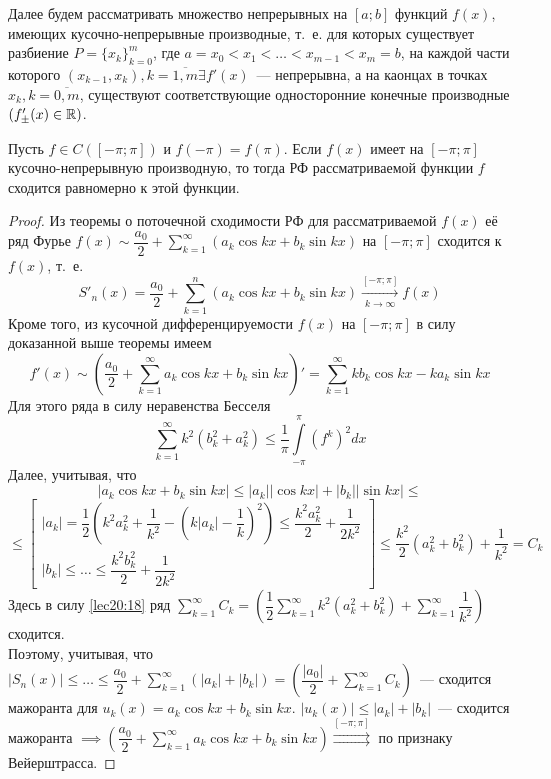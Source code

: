 \documentclass[../../main.tex]{subfiles}
\begin{document}
	Далее будем рассматривать множество непрерывных на $ [a; b] $
	функций $ f(x) $, имеющих кусочно-непрерывные производные, т.~е.
	для которых существует разбиение $ P = \{x_k\}_{k = 0}^m $, 
	где $ a = x_0 < x_1 < \dots < x_{m - 1} < x_m = b $, 
	на каждой части которого $ (x_{k - 1}, x_k), k = \overline{1, m} 
	\exists f'(x) $~--- непрерывна, а на каонцах в точках $ x_k,
	k = \overline{0, m} $, существуют соответствующие односторонние
	конечные производные$(f'_\pm(x) \in \mathbb{R})$.\\
	\begin{thm}
		Пусть $ f \in C([-\pi; \pi]) $ и $ f(-\pi) = f(\pi) $. 
		Если $ f(x) $ имеет на $ [-\pi; \pi] $ кусочно-непрерывную 
		производную, то тогда РФ рассматриваемой функции $f$
		сходится равномерно к этой функции.
	\end{thm}
	\begin{proof}
		Из теоремы о поточечной сходимости РФ для рассматриваемой 
		$ f(x) $ её ряд Фурье 
		$ f(x) \sim \dfrac{a_0}{2} + \sum\limits_{k = 1}^{\infty}
		(a_k\cos{kx} + b_k\sin{kx}) $ 
		на $ [-\pi; \pi] $ сходится к $ f(x) $, т.~е.
		\[
		S'_n(x) = \dfrac{a_0}{2} + \sum\limits_{k = 1}^n(
		a_k\cos{kx} + b_k\sin{kx}) 
		\stackrel{[-\pi; \pi]}{\underset{k \to \infty}{\to}} f(x)
		\]
		Кроме того, из кусочной дифференцируемости $ f(x) $ на 
		$ [-\pi; \pi] $ в силу доказанной выше теоремы имеем 
		\[
		f'(x) \sim \left(\dfrac{a_0}{2} + 
		\sum\limits_{k = 1}^\infty a_k\cos kx + b_k\sin kx
		\right)' = \sum\limits_{k = 1}^\infty kb_k\cos kx -
		ka_k\sin kx
		\]
		Для этого ряда в силу неравенства Бесселя
		\begin{equation}
		\label{lec20:18}
		\sum\limits_{k = 1}^\infty k^2(b_k^2 + a_k^2) \leq
		\dfrac{1}{\pi} \int\limits_{-\pi}^\pi (f^k)^2 dx
		\end{equation}
		Далее, учитывая, что
		\[
		|a_k\cos kx + b_k\sin kx| \leq |a_k||\cos kx| +
		|b_k||\sin kx| \leq \]\[ \leq
		\begin{bmatrix}
		|a_k| = \dfrac{1}{2}\left(
		k^2a_k^2 + \dfrac{1}{k^2} - \left(
		k|a_k| - \dfrac{1}{k}\right)^2
		\right) \leq \dfrac{k^2a_k^2}{2} + \dfrac{1}{2k^2}\\
		|b_k| \leq \dots \leq \dfrac{k^2b_k^2}{2} + \dfrac{1}{2k^2}
		\end{bmatrix} \leq \dfrac{k^2}{2}(a_k^2 + b_k^2) + \dfrac{1}{k^2} = C_k
		\]
		Здесь в силу \eqref{lec20:18} ряд 
		$
		\sum\limits_{k = 1}^\infty C_k =
		\left(
		\dfrac{1}{2} \sum\limits_{k = 1}^\infty 
		k^2(a_k^2 + b_k^2) + \sum\limits_{k = 1}^\infty
		\dfrac{1}{k^2}
		\right)
		$ сходится.\\
		Поэтому, учитывая, что $ |S_n(x)| \leq \dots \leq
		\dfrac{a_0}{2} + \sum\limits_{k = 1}^\infty(|a_k| + |b_k|)  =
		\left(\dfrac{|a_0|}{2} + \sum\limits_{k = 1}^\infty C_k\right)$~---
		сходится мажоранта для $ u_k(x) = a_k\cos kx + b_k\sin kx$.
		$ |u_k(x)| \leq |a_k| + |b_k| $~--- сходится мажоранта $ \implies
		\left(
		\dfrac{a_0}{2} + \sum\limits_{k = 1}^\infty a_k\cos kx + b_k\sin kx
		\right) 
		\stackrel{[-\pi; \pi]}{\rightrightarrows}
		$ по признаку Вейерштрасса.
	\end{proof}
\end{document}
